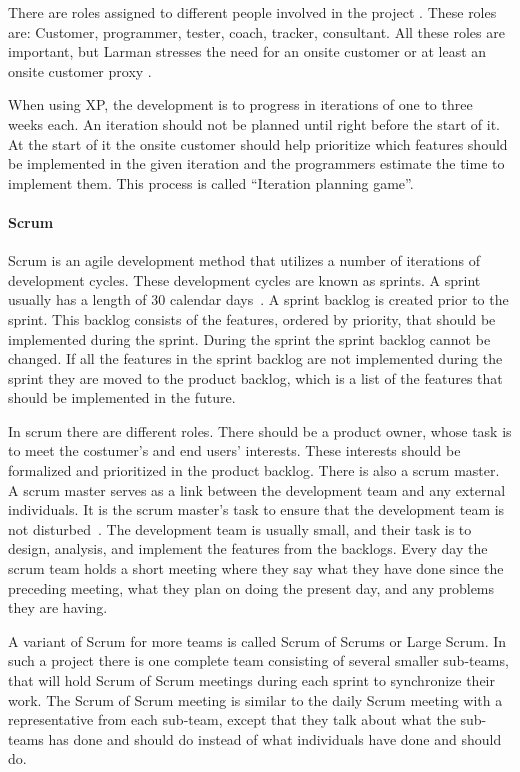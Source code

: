 There are roles assigned to different people involved in the project \cite[p.~145]{Larman04}.
These roles are: Customer, programmer, tester, coach, tracker, consultant.
All these roles are important, but Larman stresses the need for an onsite customer or at least an onsite customer proxy \cite[p.~152-156]{Larman04}.

When using XP, the development is to progress in iterations of one to three weeks each.
An iteration should not be planned until right before the start of it.
At the start of it the onsite customer should help prioritize which features should be implemented in the given iteration and the programmers estimate the time to implement them.
This process is called ``Iteration planning game''.

\paragraph{Scrum}
\label{par:scrum}
Scrum is an agile development method that utilizes a number of iterations of development cycles.
These development cycles are known as sprints.
A sprint usually has a length of 30 calendar days~\cite{Larman04}.
A sprint backlog is created prior to the sprint. 
This backlog consists of the features, ordered by priority, that should be implemented during the sprint.
During the sprint the sprint backlog cannot be changed.
If all the features in the sprint backlog are not implemented during the sprint they are moved to the product backlog, which is a list of the features that should be implemented in the future.

In scrum there are different roles. 
There should be a product owner, whose task is to meet the costumer's and end users' interests. 
These interests should be formalized and prioritized in the product backlog.
There is also a scrum master. 
A scrum master serves as a link between the development team and any external individuals.
It is the scrum master's task to ensure that the development team is not disturbed~\cite{Larman04}.
The development team is usually small, and their task is to design, analysis, and implement the features from the backlogs.
Every day the scrum team holds a short meeting where they say what they have done since the preceding meeting, what they plan on doing the present day, and any problems they are having.

A variant of Scrum for more teams is called Scrum of Scrums or Large Scrum.
In such a project there is one complete team consisting of several smaller sub-teams, that will hold Scrum of Scrum meetings during each sprint to synchronize their work.
The Scrum of Scrum meeting is similar to the daily Scrum meeting with a representative from each sub-team, except that they talk about what the sub-teams has done and should do instead of what individuals have done and should do.

